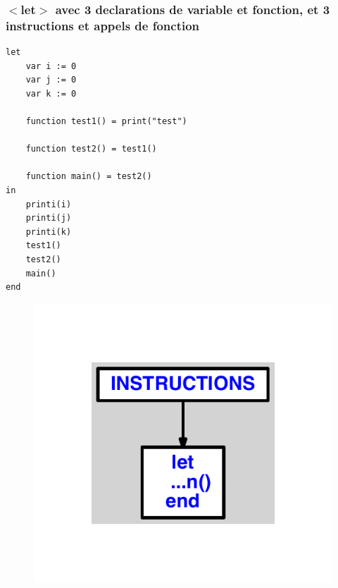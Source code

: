 \documentclass{article}
\begin{document}
\subsubsection{$ < $let$ > $ avec 3 declarations de variable et fonction, et 3 instructions et appels de fonction}
\begin{lstlisting}
let
	var i := 0
	var j := 0
	var k := 0

	function test1() = print("test")

	function test2() = test1()

	function main() = test2()
in
	printi(i)
	printi(j)
	printi(k)
	test1()
	test2()
	main()
end
\end{lstlisting}
\newpage
\begin{figure}[H]
\centering
\includegraphics[max width=\textwidth]{ast/ast_278.pdf}
\end{figure}
\newpage
\end{document}
